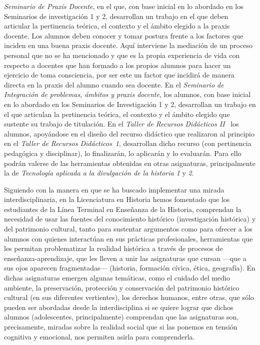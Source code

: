 \begin{Obs}
\textit{Seminario de Praxis Docente\/}, en el que, con base inicial en lo 
abordado en los Seminarios de investigación 1 y 2, desarrollan un 
trabajo en el que deben articular la pertinencia teórica, el contexto y 
el ámbito elegido a la praxis docente. Los alumnos deben conocer  y 
tomar postura frente a los factores que inciden en una buena praxis 
docente. Aquí interviene la mediación de un proceso personal que no se 
ha mencionado y que es la propia experiencia de vida con respecto a 
docentes que han formado a los propios alumnos para hacer un ejercicio 
de toma consciencia, por ser este un factor que incidirá de manera 
directa en la praxis del alumno cuando sea docente. En el 
\textit{Seminario de Integración de problemas, ámbitos y praxis 
docente\/}, los  alumnos,  con base inicial en lo abordado en los 
Seminarios de Investigación 1 y 2, desarrollan un trabajo en el que 
articulan la pertinencia teórica, el contexto y el ámbito elegido que 
sustente su trabajo de titulación. En el {\itshape Taller de Recursos 
Didácticos II\/} \ los alumnos, apoyándose en el diseño del recurso 
didáctico que realizaron al principio en el {\itshape Taller de Recursos 
Didácticos~1\/}, desarrollan dicho recurso (con pertinencia pedagógica y 
disciplinar), lo finalizarán, lo aplicarán y lo evaluarán. Para ello podrán
valerse de las herramientas obtenidas en otras asignaturas, 
principalmente la de {\itshape Tecnología aplicada a la divulgación de la historia 1\/} y 
{\itshape 2}\@. 
\end{Obs}

\enlargethispage{1\baselineskip}
Siguiendo con la manera en que se ha buscado implementar una mirada 
interdisciplinaria, en la Licenciatura en Historia hemos fomentado que 
los estudiantes de la Línea Terminal en Enseñanza de la Historia, 
comprendan la necesidad de usar las fuentes del conocimiento histórico 
(investigación histórica) y del patrimonio cultural, tanto para 
sustentar argumentos como para ofrecer a los alumnos con quienes 
interactúan en sus prácticas profesionales, herramientas que les 
permitan problematizar la realidad histórica a través de procesos de 
enseñanza-aprendizaje, que les lleven a unir las asignaturas que cursan 
---que a sus ojos aparecen fragmentadas--- (historia, formación cívica, 
ética, geografía). En dichas asignaturas emergen algunas temáticas, como el 
cuidado del medio ambiente, la preservación, protección y conservación 
del patrimonio histórico cultural (en sus diferentes vertientes), los 
derechos humanos, entre otras, que sólo pueden ser abordadas desde la 
interdisciplina si se quiere lograr que dichos alumnos (adolescentes, 
principalmente) comprendan que las asignaturas son, precisamente, 
miradas sobre la realidad social que si las ponemos en tensión 
cognitiva y emocional, nos permiten asirla para comprenderla.

